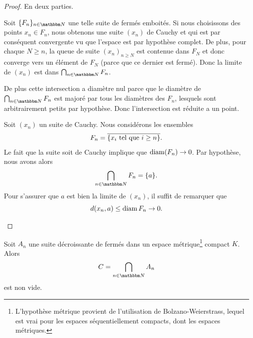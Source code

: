 \begin{proof}
    En deux parties.
    \begin{subproof}
    \item[Condition suffisante]

        Soit \( \{ F_n \}_{n\in \eN}\) une telle suite de fermés emboités. Si nous choisissons des points \( x_n\in F_n\), nous obtenons une suite \( (x_n)\) de Cauchy et qui est par conséquent convergente vu que l'espace est par hypothèse complet. De plus, pour chaque \( N\geq n\), la queue de suite \( (x_n)_{n\geq N}\) est contenue dans \( F_N\) et donc converge vers un élément de \( F_N\) (parce que ce dernier est fermé). Donc la limite de \( (x_n)\) est dans \( \bigcap_{n\in \eN}F_n\).

        De plus cette intersection a diamètre nul parce que le diamètre de \( \bigcap_{n\in \eN}F_n\) est majoré par tous les diamètres des \( F_n\), lesquels sont arbitrairement petits par hypothèse. Donc l'intersection est réduite a un point.

    \item[Condition nécessaire]

        Soit \( (x_n)\) un suite de Cauchy. Nous considérons les ensembles
        \begin{equation}
            F_n=\overline{ \{ x_i\text{ tel que } i\geq n \} }.
        \end{equation}
        Le fait que la suite soit de Cauchy implique que \( \operatorname{diam}(F_n)\to 0\). Par hypothèse, nous avons alors
        \begin{equation}
            \bigcap_{n\in \eN}F_n=\{ a \}.
        \end{equation}
        Pour s'assurer que \( a\) est bien la limite de \( (x_n)\), il suffit de remarquer que
        \begin{equation}
            d(x_n,a)\leq \operatorname{diam} F_n\to 0.
        \end{equation}
    \end{subproof}
\end{proof}


\begin{lemma}       \label{LemooynkH}
    Soit \( A_n\) une suite décroissante de fermés dans un espace métrique\footnote{L'hypothèse métrique provient de l'utilisation de Bolzano-Weierstrass, lequel est vrai pour les espaces séquentiellement compacts, dont les espaces métriques.} compact \( K\). Alors
    \begin{equation}
        C=\bigcap_{n\in \eN}A_n
    \end{equation}
    est non vide.
\end{lemma}

